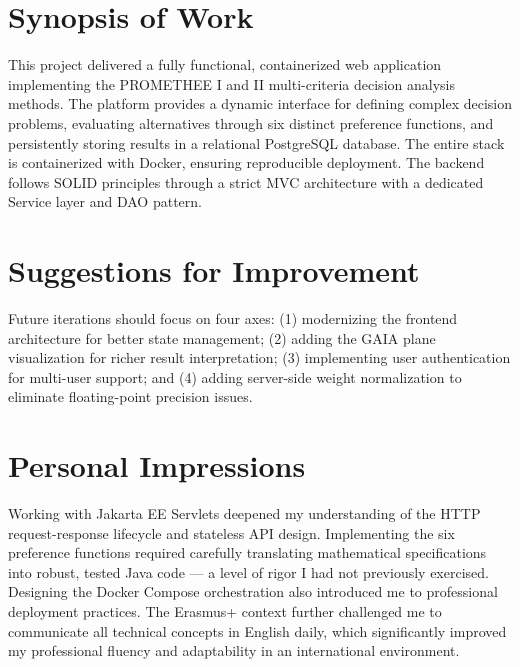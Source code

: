 \documentclass[12pt,a4paper,oneside]{report}
\begin{document}
\section{Synopsis of Work}
This project delivered a fully functional, containerized web application implementing the PROMETHEE I and II multi-criteria decision analysis methods. The platform provides a dynamic interface for defining complex decision problems, evaluating alternatives through six distinct preference functions, and persistently storing results in a relational PostgreSQL database. The entire stack is containerized with Docker, ensuring reproducible deployment. The backend follows SOLID principles through a strict MVC architecture with a dedicated Service layer and DAO pattern.

\section{Suggestions for Improvement}
Future iterations should focus on four axes: 
(1) modernizing the frontend architecture for better state management; 
(2) adding the GAIA plane visualization \cite{mareschal2013} for richer result interpretation; 
(3) implementing user authentication for multi-user support; and
(4) adding server-side weight normalization to eliminate floating-point precision issues.

\section{Personal Impressions}
Working with Jakarta EE Servlets deepened my understanding of the HTTP request-response lifecycle and stateless API design. Implementing the six preference functions required carefully translating mathematical specifications into robust, tested Java code --- a level of rigor I had not previously exercised. Designing the Docker Compose orchestration also introduced me to professional deployment practices. The Erasmus+ context further challenged me to communicate all technical concepts in English daily, which significantly improved my professional fluency and adaptability in an international environment.

\cleardoublepage
{}
\end{document}

